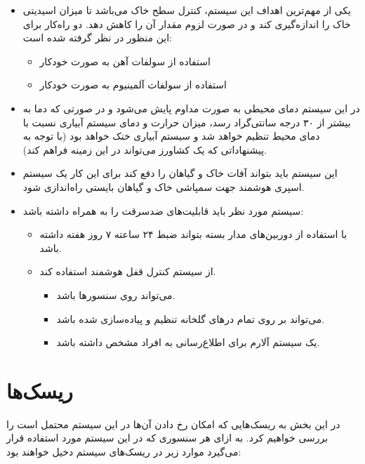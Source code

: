 \documentclass[a4paper]{report}
\begin{document}
\begin{itemize}
    \item یکی از مهم‌ترین اهداف این سیستم، کنترل سطح  خاک می‌باشد تا
    میزان اسیدیتی خاک را اندازه‌گیری کند و در صورت لزوم مقدار آن را کاهش دهد. دو
    راه‌کار برای این منظور در نظر گرفته شده است:
    \begin{itemize}
        \item استفاده از سولفات آهن به صورت خودکار
        \item استفاده از سولفات آلمینیوم به صورت خودکار
    \end{itemize}
    \item در این سیستم دمای محیطی به صورت مداوم پایش می‌شود و در صورتی که دما به
    بیشتر از ۳۰ درجه سانتی‌گراد رسد، میزان حرارت و دمای سیستم آبیاری نسبت با
    دمای محیط تنظیم خواهد شد و سیستم آبیاری خنک خواهد بود (با توجه به پیشنهاداتی
    که یک کشاورز می‌تواند در این زمینه فراهم کند).
    \item این سیستم باید بتواند آفات خاک و گیاهان را دفع کند برای این کار یک
    سیستم اسپری هوشمند جهت سمپاشی خاک و گیاهان بایستی راه‌اندازی شود.
    \item سیستم مورد نظر باید قابلیت‌های ضدسرقت را به همراه داشته باشد:
    \begin{itemize}
        \item با استفاده از دوربین‌های مدار بسته بتواند ضبط ۲۴ ساعته ۷ روز هفته
        داشته باشد.
        \item از سیستم کنترل قفل هوشمند استفاده کند.
        \begin{itemize}
            \item می‌تواند روی سنسور‌ها باشد.
            \item می‌تواند بر روی تمام در‌های گلخانه تنظیم و پیاده‌سازی شده باشد.
            \item یک سیستم آلارم برای اطلاع‌رسانی به افراد مشخص داشته باشد.
        \end{itemize}
    \end{itemize}
\end{itemize}

\section*{ریسک‌ها}

در این بخش به ریسک‌هایی که امکان رخ دادن آن‌ها در این سیستم محتمل است را بررسی
‌خواهیم کرد. به ازای هر سنسوری که در این سیستم مورد استفاده قرار می‌گیرد موارد
زیر در ریسک‌های سیستم دخیل خواهند بود:
\end{document}

